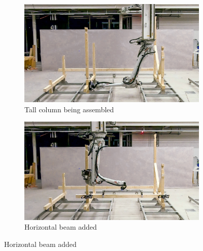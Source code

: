 \begin{figure}[!h]
    \centering
    \begin{subfigure}[b]{0.49\textwidth}
        \centering
        \includegraphics[width=\textwidth]{images/7b/img51.jpg}
        \caption{Tall column being assembled}
        \label{fig:tall-column-front}
    \end{subfigure}
    \hfill
    \begin{subfigure}[b]{0.49\textwidth}
        \centering
        \includegraphics[width=\textwidth]{images/7b/img52.jpg}
        \caption{Horizontal beam added}
        \label{fig:front-horizontal-beam-added}
    \end{subfigure}


\end{figure}
